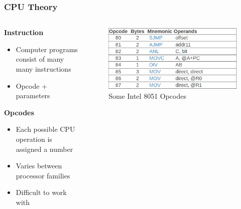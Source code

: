 \documentclass{beamer}
\begin{document}
\begin{frame}
    \frametitle{CPU Theory}
    \begin{columns}
        \begin{column}{0.55\textwidth}
			\textbf{Instruction}
			\begin{itemize}
				\item Computer programs consist of many many instructions
				\item Opcode + parameters
			\end{itemize}

			\textbf{Opcodes}
			\begin{itemize}
				\item Each possible CPU operation is assigned a number
				\item Varies between processor families
				\item Difficult to work with
			\end{itemize}
        \end{column}
        \begin{column}{0.4\textwidth}
			\begin{figure}
				\centering
                \includegraphics[width=\textwidth]{images/8051_opcodes.png}
				\caption{\small Some Intel 8051 Opcodes}
			\end{figure}
        \end{column}
    \end{columns}
\end{frame}
\end{document}
